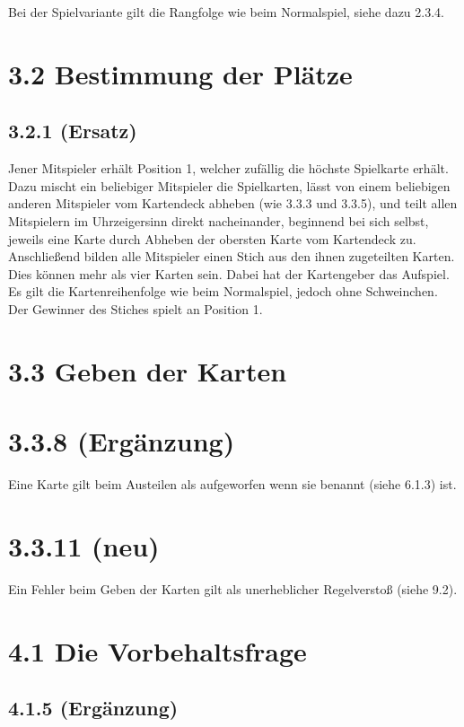 Bei der Spielvariante  gilt die Rangfolge wie beim Normalspiel,
siehe dazu 2.3.4.

\section*{3.2 Bestimmung der Plätze}

\subsection*{3.2.1 (Ersatz)}

Jener Mitspieler erhält Position 1, welcher zufällig die höchste
Spielkarte erhält. Dazu mischt ein beliebiger Mitspieler die
Spielkarten, lässt von einem beliebigen anderen Mitspieler vom
Kartendeck abheben (wie 3.3.3 und 3.3.5), und teilt allen Mitspielern im
Uhrzeigersinn direkt nacheinander, beginnend bei sich selbst, jeweils
eine Karte durch Abheben der obersten Karte vom Kartendeck zu.
Anschließend bilden alle Mitspieler einen Stich aus den ihnen
zugeteilten Karten. Dies können mehr als vier Karten sein. Dabei hat
der Kartengeber das Aufspiel. Es gilt die Kartenreihenfolge wie beim
Normalspiel, jedoch ohne Schweinchen. Der Gewinner des Stiches spielt an
Position 1.

\section*{3.3 Geben der Karten}

\section*{3.3.8 (Ergänzung)}

Eine Karte gilt beim Austeilen als aufgeworfen wenn sie benannt (siehe 6.1.3) ist.

\section*{3.3.11 (neu)}

Ein Fehler beim Geben der Karten gilt als unerheblicher Regelverstoß (siehe
9.2).

\section*{4.1 Die Vorbehaltsfrage}

\subsection*{4.1.5 (Ergänzung)}

